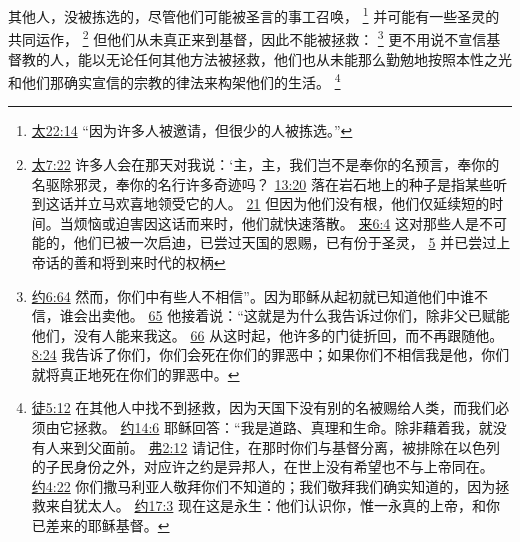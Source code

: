 \documentclass[12pt, a4paper, oneside]{ctexart}
\newcounter{parnum}[section]
\newcommand{\N}{%
   \noindent\refstepcounter{parnum}%
    \makebox[\parindent][l]{\textbf{\arabic{parnum}.}}}
\begin{document}
\N 其他人，没被拣选的，尽管他们可能被圣言的事工召唤，
	\footnote {
		\href{https://biblehub.com/matthew/22-14.htm}{太22:14} “因为许多人被邀请，但很少的人被拣选。”
	}
	并可能有一些圣灵的共同运作，
	\footnote {
		\href{https://biblehub.com/matthew/7-22.htm}{太7:22} 许多人会在那天对我说：‘主，主，我们岂不是奉你的名预言，奉你的名驱除邪灵，奉你的名行许多奇迹吗？
		\href{https://biblehub.com/matthew/13-20.htm}{13:20} 落在岩石地上的种子是指某些听到这话并立马欢喜地领受它的人。
		\href{https://biblehub.com/matthew/13-21.htm}{21} 但因为他们没有根，他们仅延续短的时间。当烦恼或迫害因这话而来时，他们就快速落散。
		\href{https://biblehub.com/hebrews/6-4.htm}{来6:4} 这对那些人是不可能的，他们已被一次启迪，已尝过天国的恩赐，已有份于圣灵，
		\href{https://biblehub.com/hebrews/6-5.htm}{5} 并已尝过上帝话的善和将到来时代的权柄
	}
	但他们从未真正来到基督，因此不能被拯救：
	\footnote {
		\href{https://biblehub.com/john/6-64.htm}{约6:64} 然而，你们中有些人不相信”。因为耶稣从起初就已知道他们中谁不信，谁会出卖他。
		\href{https://biblehub.com/john/6-65.htm}{65} 他接着说：“这就是为什么我告诉过你们，除非父已赋能他们，没有人能来我这。
		\href{https://biblehub.com/john/6-66.htm}{66} 从这时起，他许多的门徒折回，而不再跟随他。
		\href{https://biblehub.com/john/8-24.htm}{8:24} 我告诉了你们，你们会死在你们的罪恶中；如果你们不相信我是他，你们就将真正地死在你们的罪恶中。
	}
	更不用说不宣信基督教的人，能以无论任何其他方法被拯救，他们也从未能那么勤勉地按照本性之光和他们那确实宣信的宗教的律法来构架他们的生活。
	\footnote {
		\href{https://biblehub.com/acts/4-12.htm}{徒5:12} 在其他人中找不到拯救，因为天国下没有别的名被赐给人类，而我们必须由它拯救。
		\href{https://biblehub.com/john/14-6.htm}{约14:6} 耶稣回答：“我是道路、真理和生命。除非藉着我，就没有人来到父面前。
		\href{https://biblehub.com/ephesians/2-12.htm}{弗2:12} 请记住，在那时你们与基督分离，被排除在以色列的子民身份之外，对应许之约是异邦人，在世上没有希望也不与上帝同在。
		\href{https://biblehub.com/john/4-22.htm}{约4:22} 你们撒马利亚人敬拜你们不知道的；我们敬拜我们确实知道的，因为拯救来自犹太人。
		\href{https://biblehub.com/john/17-3.htm}{约17:3} 现在这是永生：他们认识你，惟一永真的上帝，和你已差来的耶稣基督。
	}
\end{document}
